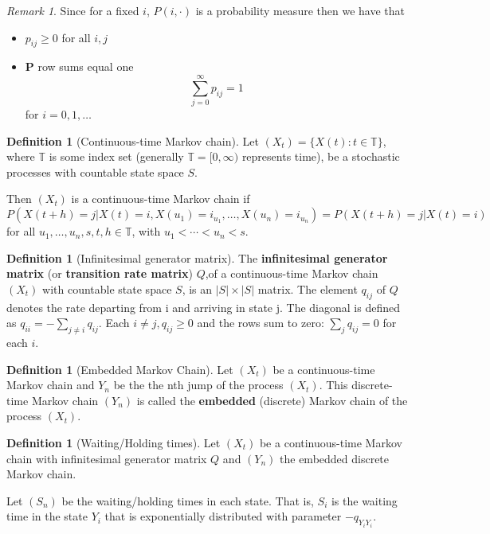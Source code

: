 \documentclass{article}
\theoremstyle{plain}
\theoremstyle{definition}
\newtheorem{defn}[theorem]{Definition}
\theoremstyle{remark}
\newtheorem*{remark}{Remark}
\numberwithin{equation}{section}
\begin{document}
\begin{remark}
Since for a fixed $i$, $P(i, \cdot)$ is a probability measure then we have that
\begin{itemize}
    \item $p_{ij} \geq 0$ for all $i,j$
    \item $\mathbf{P}$ row sums equal one
    $$
    \sum_{j = 0}^\infty p_{ij} = 1
    $$
    for $i = 0, 1, \ldots$
\end{itemize}
\end{remark}

\begin{defn}[Continuous-time Markov chain]
Let $(X_t) = \{X(t) : t \in \mathbb T\}$, where $\mathbb T$ is some index set (generally $\mathbb T = [0, \infty)$ represents time), be a stochastic processes with countable state space $S$.

Then $(X_t)$ is a continuous-time Markov chain if 
$$
P(X(t + h) = j | X(t) = i, X(u_1) = i_{u_1}, \ldots, X(u_n) = i_{u_n}) = P(X(t + h) = j | X(t) = i)
$$
for all $u_1,\ldots, u_n, s,t,h \in \mathbb T$, with $u_1 < \cdots < u_n < s$.
\end{defn}

\begin{defn}[Infinitesimal generator matrix]
The \textbf{infinitesimal generator matrix} (or \textbf{transition rate matrix}) $Q$,of a continuous-time Markov chain $(X_t)$ with countable state space $S$, is an $|S| \times |S|$ matrix.
The element $q_{ij}$ of $Q$ denotes the rate departing from i and arriving in state j.
The diagonal is defined as $q_{ii} = - \sum_{j \not = i} q_{ij}$.
Each $i \not = j, q_{ij} \geq 0$ and the rows sum to zero: $\sum_{j} q_{ij} = 0$ for each $i$.
\end{defn}

\begin{defn}[Embedded Markov Chain]
Let $(X_t)$ be a continuous-time Markov chain and $Y_n$ be the the nth jump of the process $(X_t)$.
This discrete-time Markov chain $(Y_n)$ is called the \textbf{embedded} (discrete) Markov chain of the process $(X_t)$.
\end{defn}

\begin{defn}[Waiting/Holding times]
Let $(X_t)$ be a continuous-time Markov chain with infinitesimal generator matrix $Q$ and $(Y_n)$ the embedded discrete Markov chain.

Let $(S_n)$ be the waiting/holding times in each state.
That is, $S_i$ is the waiting time in the state $Y_i$ that is exponentially distributed with parameter $- q_{Y_i Y_i}$.
\end{defn}
\end{document}

